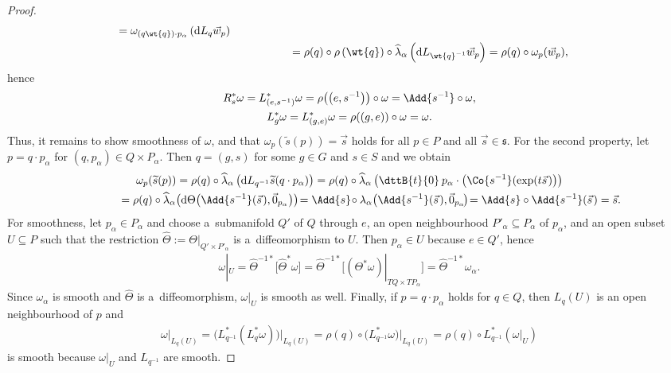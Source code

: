 \begin{proof}
\begin{gather*}
\begin{split}
=\omega_{(q\wt{q})\cdot p_\alpha}\left(\mathrm{d} L_q \vec{w}_{p}\right)
\\
&\phantom{\left(L_q^{*}\omega\right)_{p}(\vec{w}_{p})}
=\rho(q)\circ\rho\left(\wt{q}\right)\circ \widehat{\lambda}_\alpha\left(\mathrm{d}
L_{\wt{q}^{-1}}\vec{w}_{p}\right) =\rho(q)\circ \omega_{p}(\vec{w}_{p}),
\end{split}
\end{gather*}
hence
\begin{gather*}
R_s^{*}\omega\phantom{}=L_{\left(e,s^{-1}\right)}^{*}\omega=\rho\big(\big(e,s^{-1}\big)\big)\circ \omega
=\Add{s^{-1}}\circ \omega,
\\
L_g^{*}\omega =L_{(g,e)}^{*}\omega=\rho((g,e))\circ \omega=\omega.
\end{gather*}
Thus, it remains to show smoothness of $\omega$, and that $\omega_p(\widetilde{s}(p))=\vec{s}$ holds for all $p\in P$ and
all $\vec{s}\in \mathfrak{s}$.
For the second property, let $p=q\cdot p_\alpha$ for $(q,p_\alpha)\in Q\times P_\alpha$.
Then $q=(g,s)$ for some $g\in G$ and $s\in S$ and we obtain
\begin{gather*}
\omega_{p}(\widetilde{s}(p))=\rho(q)\circ \widehat{\lambda}_\alpha\left(\mathrm{d} L_{q^{-1}}\widetilde{s}(q\cdot
p_\alpha)\right)
=\rho(q)\circ \widehat{\lambda}_\alpha\left(\dttB{t}{0}\hspace{2pt} p_\alpha\cdot
\left(\Co{s^{-1}}(\exp(t\vec{s}\hspace{1pt})\right)\right)
\\
\phantom{\omega_{p}(\widetilde{s}(p))}
=\rho(q)\circ\widehat{\lambda}_\alpha
\big(\mathrm{d}\Theta\big(\Add{s^{-1}}(\vec{s}\hspace{1pt}),\vec{0}_{p_\alpha}\big)\big)\!
=\Add{s}\!\circ \lambda_\alpha\big(\Add{s^{-1}}(\vec{s}\hspace{1pt}),\vec{0}_{p_\alpha}\!\big)\!
=\Add{s}\circ\Add{s^{-1}}(\vec{s}\hspace{1pt})=\vec{s}.
\end{gather*}
For smoothness, let $p_\alpha\in P_\alpha$ and choose a~submanifold $Q'$ of $Q$ through $e$, an open neighbourhood
$P'_\alpha\subseteq P_\alpha$ of $p_\alpha$, and an open subset $U\subseteq P$ such that the restriction
$\widehat{\Theta}:=\Theta|_{Q' \times P'_\alpha}$ is a~dif\/feomorphism to $U$.
Then $p_\alpha \in U$ because $e\in Q'$, hence
\begin{gather*}
\omega|_U=\widehat{\Theta}^{-1*} \big[\widehat{\Theta}^{*}\omega\big]
=\widehat{\Theta}^{-1*} \big[(\Theta^{*}\omega)|_{TQ\times
TP_\alpha}\big] =\widehat{\Theta}^{-1*} \omega_\alpha.
\end{gather*}
Since $\omega_\alpha$ is smooth and $\widehat{\Theta}$ is a~dif\/feomorphism, $\omega|_U$ is smooth as well.
Finally, if $p=q\cdot p_\alpha$ holds for $q\in Q$, then $L_q(U)$ is an open neighbourhood of $p$ and
\begin{gather*}
\omega|_{L_q(U)}=\big(L_{q^{-1}}^{*}\left(L_q^{*}\omega\right)\big)\big|_{L_q(U)}= \rho(q)\circ
\big(L_{q^{-1}}^{*}\omega\big)\big|_{L_q(U)} =\rho(q)\circ L_{q^{-1}}^{*} \left(\omega|_U\right)
\end{gather*}
is smooth because $\omega|_U$ and $L_{q^{-1}}$ are smooth.
\end{proof}


